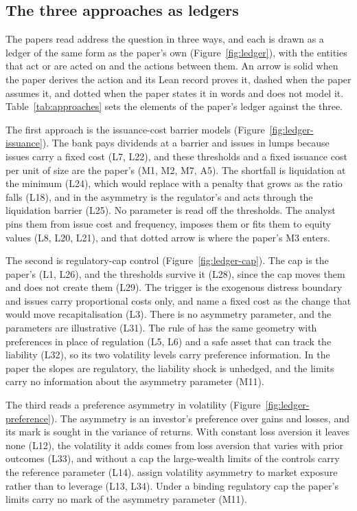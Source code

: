\subsection{The three approaches as ledgers}
\label{sec:approaches}

The papers read address the question in three ways, and each is drawn as a
ledger of the same form as the paper's own (Figure~\ref{fig:ledger}), with the
entities that act or are acted on and the actions between them. An arrow is
solid when the paper derives the action and its Lean record proves it, dashed
when the paper assumes it, and dotted when the paper states it in words and
does not model it. Table~\ref{tab:approaches} sets the elements of the
paper's ledger against the three.

The first approach is the issuance-cost barrier models
(Figure~\ref{fig:ledger-issuance}). The bank pays dividends at a barrier and
issues in lumps because issues carry a fixed cost (L7, L22), and these
thresholds and a fixed issuance cost per unit of size are the paper's (M1, M2, M7,
A5). The shortfall is liquidation at the minimum (L24), which
\citet{peura2006} would replace with a penalty that grows as the ratio falls
(L18), and in \citet{daihuangkeppo2019} the asymmetry is the regulator's and
acts through the liquidation barrier (L25). No parameter is read off the
thresholds. The analyst pins them from issue cost and frequency, imposes them
or fits them to equity values (L8, L20, L21), and that dotted arrow is where
the paper's M3 enters.

The second is regulatory-cap control (Figure~\ref{fig:ledger-cap}). The cap
is the paper's (L1, L26), and the thresholds survive it (L28), since the cap
moves them and does not create them (L29). The trigger is the exogenous
distress boundary and issues carry proportional costs only, and
\citet{bayraktar2026} name a fixed cost as the change that would move
recapitalisation (L3). There is no asymmetry parameter, and the parameters are
illustrative (L31). The rule of \citet{blackperold1992} has the same geometry
with preferences in place of regulation (L5, L6) and a safe asset that can
track the liability (L32), so its two volatility levels carry preference
information. In the paper the slopes are regulatory, the liability shock is
unhedged, and the limits carry no information about the asymmetry parameter
(M11).

The third reads a preference asymmetry in volatility
(Figure~\ref{fig:ledger-preference}). The asymmetry is an investor's
preference over gains and losses, and its mark is sought in the variance of
returns. With constant loss aversion it leaves none (L12), the volatility it
adds comes from loss aversion that varies with prior outcomes (L33), and
without a cap the large-wealth limits of the controls carry the reference
parameter (L14). \citet{engle2018} assign volatility asymmetry to market
exposure rather than to leverage (L13, L34). Under a binding regulatory cap
the paper's limits carry no mark of the asymmetry parameter (M11).

